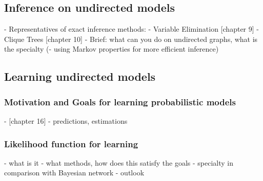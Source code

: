 \subsection{Inference on undirected models}

- Representatives of exact inference methods:
  - Variable Elimination [chapter 9]
  - Clique Trees [chapter 10]
- Brief: what can you do on undirected graphs, what is the specialty
(- using Markov properties for more efficient inference)

\subsection{Learning undirected models}

\subsubsection{Motivation and Goals for learning probabilistic models}
- [chapter 16]
- predictions, estimations

\subsubsection{Likelihood function for learning}

- what is it
- what methods, how does this satisfy the goals
- specialty in comparison with Bayesian network
- outlook